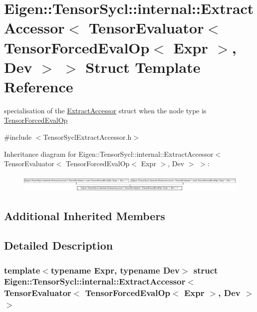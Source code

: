 \hypertarget{struct_eigen_1_1_tensor_sycl_1_1internal_1_1_extract_accessor_3_01_tensor_evaluator_3_01_tensor_4b3a89d7601e1f705c94a0624a0d4c92}{}\section{Eigen\+:\+:Tensor\+Sycl\+:\+:internal\+:\+:Extract\+Accessor$<$ Tensor\+Evaluator$<$ Tensor\+Forced\+Eval\+Op$<$ Expr $>$, Dev $>$ $>$ Struct Template Reference}
\label{struct_eigen_1_1_tensor_sycl_1_1internal_1_1_extract_accessor_3_01_tensor_evaluator_3_01_tensor_4b3a89d7601e1f705c94a0624a0d4c92}


specialisation of the \hyperlink{struct_eigen_1_1_tensor_sycl_1_1internal_1_1_extract_accessor}{Extract\+Accessor} struct when the node type is \hyperlink{class_eigen_1_1_tensor_forced_eval_op}{Tensor\+Forced\+Eval\+Op}  




{\ttfamily \#include $<$Tensor\+Sycl\+Extract\+Accessor.\+h$>$}

Inheritance diagram for Eigen\+:\+:Tensor\+Sycl\+:\+:internal\+:\+:Extract\+Accessor$<$ Tensor\+Evaluator$<$ Tensor\+Forced\+Eval\+Op$<$ Expr $>$, Dev $>$ $>$\+:\begin{figure}[H]
\begin{center}
\leavevmode
\includegraphics[height=0.862866cm]{struct_eigen_1_1_tensor_sycl_1_1internal_1_1_extract_accessor_3_01_tensor_evaluator_3_01_tensor_4b3a89d7601e1f705c94a0624a0d4c92}
\end{center}
\end{figure}
\subsection*{Additional Inherited Members}


\subsection{Detailed Description}
\subsubsection*{template$<$typename Expr, typename Dev$>$\newline
struct Eigen\+::\+Tensor\+Sycl\+::internal\+::\+Extract\+Accessor$<$ Tensor\+Evaluator$<$ Tensor\+Forced\+Eval\+Op$<$ Expr $>$, Dev $>$ $>$}

